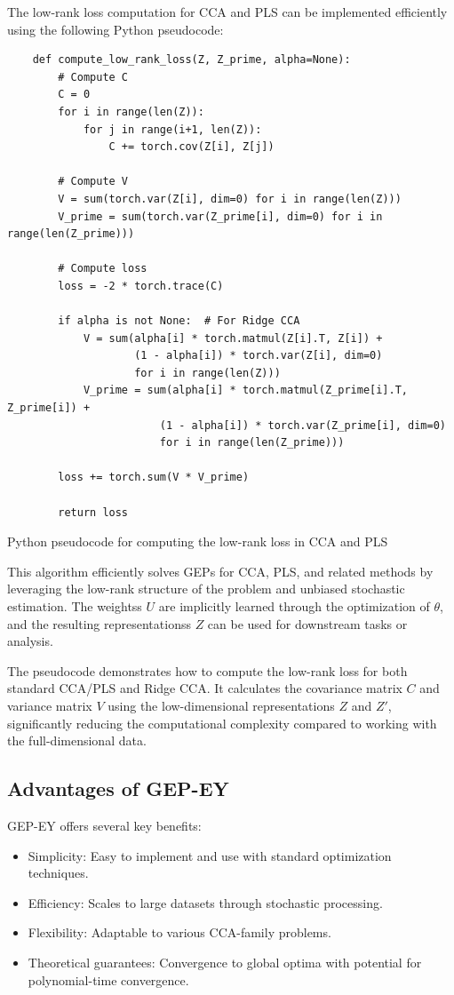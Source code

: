 The low-rank loss computation for CCA and PLS can be implemented efficiently using the following Python pseudocode:

\begin{listing}[ht]
    \begin{verbatim}
    def compute_low_rank_loss(Z, Z_prime, alpha=None):
        # Compute C
        C = 0
        for i in range(len(Z)):
            for j in range(i+1, len(Z)):
                C += torch.cov(Z[i], Z[j])
        
        # Compute V
        V = sum(torch.var(Z[i], dim=0) for i in range(len(Z)))
        V_prime = sum(torch.var(Z_prime[i], dim=0) for i in range(len(Z_prime)))
        
        # Compute loss
        loss = -2 * torch.trace(C)
        
        if alpha is not None:  # For Ridge CCA
            V = sum(alpha[i] * torch.matmul(Z[i].T, Z[i]) + 
                    (1 - alpha[i]) * torch.var(Z[i], dim=0) 
                    for i in range(len(Z)))
            V_prime = sum(alpha[i] * torch.matmul(Z_prime[i].T, Z_prime[i]) + 
                        (1 - alpha[i]) * torch.var(Z_prime[i], dim=0) 
                        for i in range(len(Z_prime)))
        
        loss += torch.sum(V * V_prime)
        
        return loss
    \end{verbatim}
    \caption{Python pseudocode for computing the low-rank loss in CCA and PLS}
    \label{lst:low-rank-loss}
\end{listing}

This algorithm efficiently solves GEPs for CCA, PLS, and related methods by leveraging the low-rank structure of the problem and unbiased stochastic estimation. The \glspl{weights} $U$ are implicitly learned through the optimization of $\theta$, and the resulting \glspl{representations} $Z$ can be used for downstream tasks or analysis.

The pseudocode demonstrates how to compute the low-rank loss for both standard CCA/PLS and Ridge CCA. It calculates the covariance matrix $C$ and variance matrix $V$ using the low-dimensional representations $Z$ and $Z'$, significantly reducing the computational complexity compared to working with the full-dimensional data.

\subsection{Advantages of GEP-EY}
GEP-EY offers several key benefits:
\begin{itemize}
\item Simplicity: Easy to implement and use with standard optimization techniques.
\item Efficiency: Scales to large datasets through stochastic processing.
\item Flexibility: Adaptable to various CCA-family problems.
\item Theoretical guarantees: Convergence to global optima with potential for polynomial-time convergence.
\end{itemize}

